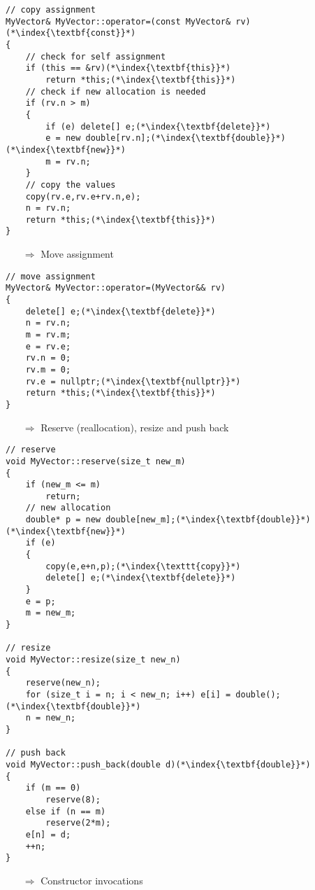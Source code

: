 \documentclass[10pt]{article}
\begin{document}
\begin{lstlisting}
// copy assignment
MyVector& MyVector::operator=(const MyVector& rv)(*\index{\textbf{const}}*)
{
    // check for self assignment
    if (this == &rv)(*\index{\textbf{this}}*)
        return *this;(*\index{\textbf{this}}*)
    // check if new allocation is needed
    if (rv.n > m)
    {
        if (e) delete[] e;(*\index{\textbf{delete}}*)
        e = new double[rv.n];(*\index{\textbf{double}}*)(*\index{\textbf{new}}*)
        m = rv.n;
    }
    // copy the values
    copy(rv.e,rv.e+rv.n,e);
    n = rv.n;
    return *this;(*\index{\textbf{this}}*)
}
\end{lstlisting}
\begin{enumerate}
\item[$\Rightarrow$] Move assignment
\end{enumerate}
\begin{lstlisting}
// move assignment
MyVector& MyVector::operator=(MyVector&& rv)
{
    delete[] e;(*\index{\textbf{delete}}*)
    n = rv.n;
    m = rv.m;
    e = rv.e;
    rv.n = 0;
    rv.m = 0;
    rv.e = nullptr;(*\index{\textbf{nullptr}}*)
    return *this;(*\index{\textbf{this}}*)
}
\end{lstlisting}
\begin{enumerate}
\item[$\Rightarrow$] Reserve (reallocation), resize and push back
\end{enumerate}
\begin{lstlisting}
// reserve
void MyVector::reserve(size_t new_m)
{
    if (new_m <= m)
        return;
    // new allocation
    double* p = new double[new_m];(*\index{\textbf{double}}*)(*\index{\textbf{new}}*)
    if (e)
    {
        copy(e,e+n,p);(*\index{\texttt{copy}}*)
        delete[] e;(*\index{\textbf{delete}}*)
    }
    e = p;
    m = new_m;
}

// resize
void MyVector::resize(size_t new_n)
{
    reserve(new_n);
    for (size_t i = n; i < new_n; i++) e[i] = double();(*\index{\textbf{double}}*)
    n = new_n;
}

// push back
void MyVector::push_back(double d)(*\index{\textbf{double}}*)
{
    if (m == 0)
        reserve(8);
    else if (n == m)
        reserve(2*m);
    e[n] = d;
    ++n;
}
\end{lstlisting}
\begin{enumerate}
\item[$\Rightarrow$] Constructor invocations
\end{enumerate}
\end{document}
